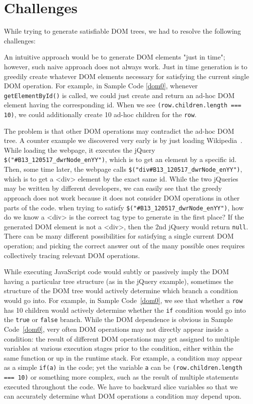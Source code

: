 \section{Challenges}
While trying to generate satisfiable DOM trees, we had to resolve the following challenges:  

An intuitive approach would be to generate DOM elements "just in time"; however, such naive approach does not always work.  
Just in time generation is to greedily create whatever DOM elements necessary for satisfying the current single DOM operation.  
For example, in Sample Code \ref{dom0}, whenever {\tt getElementById()} is called, we could just create and return an ad-hoc DOM element having the corresponding id.  
When we see {\tt (row.children.length === 10)}, we could additionally create 10 ad-hoc children for the {\tt row}.  

The problem is that other DOM operations may contradict the ad-hoc DOM tree.  
A counter example we discovered very early is by just loading Wikipedia~\cite{wikipedia}.  
While loading the webpage, it executes the jQuery {\tt \$("\#B13\_120517\_dwrNode\_enYY")}, which is to get an element by a specific id.  
Then, some time later, the webpage calls {\tt \$("div\#B13\_120517\_dwrNode\_enYY")}, which is to get a <div> element by the exact same id.  
While the two jQueries may be written by different developers, we can easily see that the greedy approach does not work because it does not consider DOM operations in other parts of the code.
when trying to satisfy {\tt \$("\#B13\_120517\_dwrNode\_enYY")}, how do we know a <div> is the correct tag type to generate in the first place?  
If the generated DOM element is not a <div>, then the 2nd jQuery would return {\tt null}.  
There can be many different possibilities for satisfying a single current DOM operation; and picking the correct answer out of the many possible ones requires collectively tracing relevant DOM operations.  


While executing JavaScript code would subtly or passively imply the DOM having a particular tree structure (as in the jQuery example), sometimes the structure of the DOM tree would actively determine which branch a condition would go into.  
For example, in Sample Code~\ref{dom0}, we see that whether a {\tt row} has 10 children would actively determine whether the {\tt if} condition would go into the {\tt true} or {\tt false} branch.
While the DOM dependence is obvious in Sample Code~\ref{dom0}, very often DOM operations may not directly appear inside a condition: the result of different DOM operations may get assigned to multiple variables at various execution stages prior to the condition, either within the same function or up in the runtime stack.  
For example, a condition may appear as a simple {\tt if(a)} in the code; yet the variable {\tt a} can be {\tt (row.children.length === 10)} or something more complex, such as the result of multiple statements executed throughout the code.  
We have to backward slice variables so that we can accurately determine what DOM operations a condition may depend upon.  


